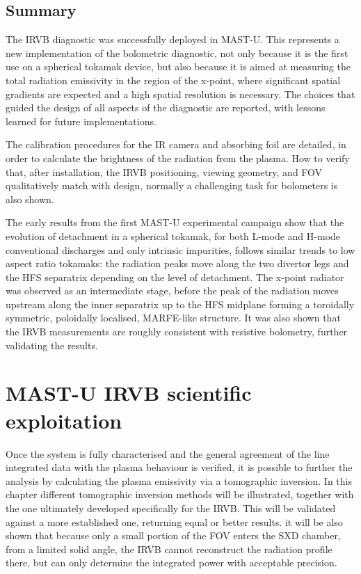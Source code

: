 \section{Summary}\label{Summary IRVB hardware}

The IRVB diagnostic was successfully deployed in MAST-U. This represents a new implementation of the bolometric diagnostic, not only because it is the first use on a spherical tokamak device, but also because it is aimed at measuring the total radiation emissivity in the region of the x-point, where significant spatial gradients are expected and a high spatial resolution is necessary. The choices that guided the design of all aspects of the diagnostic are reported, with lessons learned for future implementations.

The calibration procedures for the IR camera and absorbing foil are detailed, in order to calculate the brightness of the radiation from the plasma. How to verify that, after installation, the IRVB positioning, viewing geometry, and FOV qualitatively match with design, normally a challenging task for bolometers is also shown. 

The early results from the first MAST-U experimental campaign show that the evolution of detachment in a spherical tokamak, for both L-mode and H-mode conventional discharges and only intrinsic impurities, follows similar trends to low aspect ratio tokamaks: the radiation peaks move along the two divertor legs and the HFS separatrix depending on the level of detachment. The x-point radiator was observed as an intermediate stage, before the peak of the radiation moves upstream along the inner separatrix up to the HFS midplane forming a toroidally symmetric, poloidally localised, MARFE-like structure. It was also shown that the IRVB measurements are roughly consistent with resistive bolometry, further validating the results.




\chapter{MAST-U IRVB scientific exploitation}\label{chapter2.5}

Once the system is fully characterised and the general agreement of the line integrated data with the plasma behaviour is verified, it is possible to further the analysis by calculating the plasma emissivity via a tomographic inversion. In this chapter different tomographic inversion methods will be illustrated, together with the one ultimately developed specifically for the IRVB. This will be validated against a more established one, returning equal or better results. it will be also shown that because only a small portion of the FOV enters the SXD chamber, from a limited solid angle, the IRVB cannot reconstruct the radiation profile there, but can only determine the integrated power with acceptable precision.


